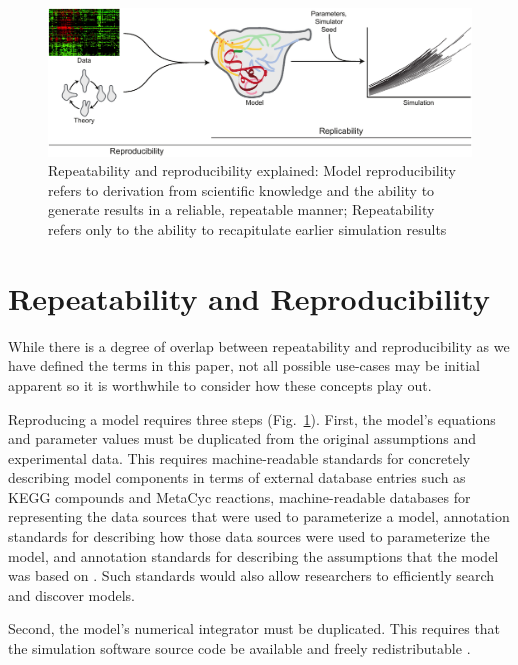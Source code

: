 \documentclass[journal,transmag,twoside]{IEEEtran}
\begin{document}
\begin{figure}[!t]
\centering
\includegraphics[width=\textwidth]{figure1/figure1}
\caption{Repeatability and reproducibility explained: Model reproducibility refers to derivation from scientific knowledge and the ability to generate results in a reliable, repeatable manner;
Repeatability refers only to the ability to recapitulate earlier simulation results}
\label{fig_repro_diagram}
\end{figure}

\section{Repeatability and Reproducibility}

While there is a degree of overlap between repeatability and reproducibility as we have defined the terms in this paper, not all possible use-cases may be initial apparent so it is worthwhile to consider how these concepts play out.

Reproducing a model requires three steps (Fig.~\ref{fig_repro_diagram}). First, the model's equations and parameter values must be duplicated from the original assumptions and experimental data. This requires machine-readable standards for concretely describing model components in terms of external database entries such as KEGG \cite{kanehisa2000kegg} compounds and MetaCyc \cite{caspi2008metacyc} reactions, machine-readable databases for representing the data sources that were used to parameterize a model, annotation standards for describing how those data sources were used to parameterize the model, and annotation standards for describing the assumptions that the model was based on \cite{boulton2012open}. Such standards would also allow researchers to efficiently search and discover models.

Second, the model's numerical integrator must be duplicated. This requires that the simulation software source code be available and freely redistributable \cite{easterbrook2014open}.
\end{document}
